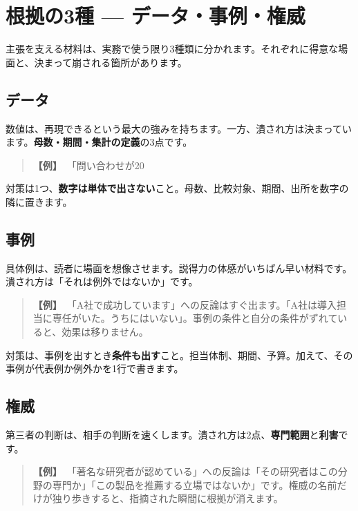 \documentclass{article}
\begin{document}
\section{根拠の3種 — データ・事例・権威}

主張を支える材料は、実務で使う限り3種類に分かれます。それぞれに得意な場面と、決まって崩される箇所があります。

\subsection{データ}

数値は、再現できるという最大の強みを持ちます。一方、潰され方は決まっています。\textbf{母数・期間・集計の定義}の3点です。

\begin{quote}
\textbf{【例】}\ 「問い合わせが20%
\end{quote}

対策は1つ、\textbf{数字は単体で出さない}こと。母数、比較対象、期間、出所を数字の隣に置きます。

\subsection{事例}

具体例は、読者に場面を想像させます。説得力の体感がいちばん早い材料です。潰され方は「それは例外ではないか」です。

\begin{quote}
\textbf{【例】}\ 「A社で成功しています」への反論はすぐ出ます。「A社は導入担当に専任がいた。うちにはいない」。事例の条件と自分の条件がずれていると、効果は移りません。
\end{quote}

対策は、事例を出すとき\textbf{条件も出す}こと。担当体制、期間、予算。加えて、その事例が代表例か例外かを1行で書きます。

\subsection{権威}

第三者の判断は、相手の判断を速くします。潰され方は2点、\textbf{専門範囲}と\textbf{利害}です。

\begin{quote}
\textbf{【例】}\ 「著名な研究者が認めている」への反論は「その研究者はこの分野の専門か」「この製品を推薦する立場ではないか」です。権威の名前だけが独り歩きすると、指摘された瞬間に根拠が消えます。
\end{quote}
\end{document}

